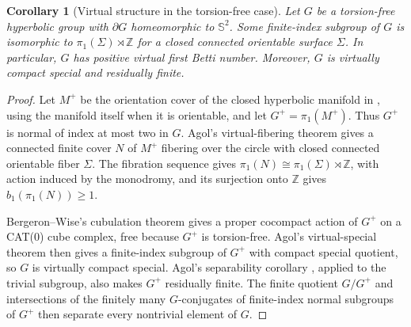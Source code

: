 \documentclass[11pt]{article}
\numberwithin{equation}{section}
\newtheorem{corollary}[corollary]{Corollary}
\theoremstyle{definition}
\theoremstyle{remark}
\newcommand{\ZZ}{\mathbb Z}
\newcommand{\Sphere}{\mathbb S^2}
\begin{document}
\begin{corollary}[Virtual structure in the torsion-free case]
\label{cor:virtual-structure}
Let $G$ be a torsion-free hyperbolic group with $\partial G$ homeomorphic
to $\Sphere$. Some finite-index subgroup of $G$ is isomorphic to
$\pi_1(\Sigma)\rtimes\ZZ$ for a closed connected orientable surface
$\Sigma$. In particular, $G$ has positive virtual first Betti number.
Moreover, $G$ is virtually compact special and residually finite.
\end{corollary}
\begin{proof}
Let $M^+$ be the orientation cover of the closed hyperbolic manifold in
, using the manifold itself when it is orientable,
and let $G^+=\pi_1(M^+)$. Thus $G^+$ is normal of index at most two in
$G$. Agol's virtual-fibering theorem
\cite[Theorem 9.2]{Agol} gives a connected finite cover $N$ of $M^+$
fibering over the circle with closed connected orientable fiber $\Sigma$.
The fibration sequence gives
$\pi_1(N)\cong\pi_1(\Sigma)\rtimes\ZZ$, with action induced by the
monodromy, and its surjection onto $\ZZ$ gives $b_1(\pi_1(N))\ge1$.

Bergeron--Wise's cubulation theorem \cite[Theorem 5.3]{BergeronWise}
gives a proper cocompact action of $G^+$ on a CAT(0) cube complex, free
because $G^+$ is torsion-free. Agol's virtual-special theorem
\cite[Theorem 1.1]{Agol} then gives a finite-index subgroup of $G^+$
with compact special quotient, so $G$ is virtually compact special.
Agol's separability corollary \cite[Corollary 1.3]{Agol}, applied to the
trivial subgroup, also makes $G^+$ residually finite. The finite quotient
$G/G^+$ and intersections of the finitely many $G$-conjugates of
finite-index normal subgroups of $G^+$ then separate every nontrivial
element of $G$.
\end{proof}


\end{document}
